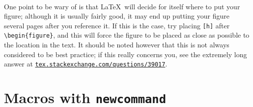 \documentclass[11pt]{article}
\begin{document}
\paragraph{}
 One point to be wary of is that \LaTeX\ will decide for itself where to put your figure; although it is usually fairly good, it may end up putting your figure several pages after you reference it. If this is the case, try placing \verb$[h]$ after \verb$\begin{figure}$, and this will force the figure to be placed as close as possible to the location in the text.  It should be noted however that this is not always considered to be best practice; if this really concerns you, see the extremely long answer at \href{https://tex.stackexchange.com/questions/39017}{\texttt{tex.stackexchange.com/questions/39017}}.

\section{Macros with \texttt{newcommand}}
\end{document}
